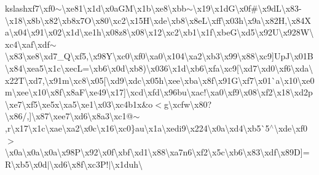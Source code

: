 kslash{}xf7\textbackslash{}xf0$\sim$\textbackslash{}xe81\textbackslash{}x1d\textbackslash{}x0a\+G\+M\textbackslash{}x1b\textbackslash{}xe8\textbackslash{}xbb$\sim$\textbackslash{}x19\textbackslash{}x1d\+G\textbackslash{}x0f\#\textbackslash{}x9d\+L\textbackslash{}x83-\/\textbackslash{}x18\textbackslash{}x8b\textbackslash{}x82\textbackslash{}xb8x7\+O\textbackslash{}x80\textbackslash{}xc2\textbackslash{}x15\+H\textbackslash{}xde\textbackslash{}xb8\textbackslash{}x8e\+L\textbackslash{}xff\textbackslash{}x03h\textbackslash{}x9a\textbackslash{}x82\+H,\textbackslash{}x84\+Xa\textbackslash{}x04\textbackslash{}x91\textbackslash{}x02\textbackslash{}x1d\textbackslash{}xe1h\textbackslash{}x08z8\textbackslash{}x08\textquotesingle{}\textbackslash{}x12\textbackslash{}xc2\textbackslash{}xb1\textbackslash{}x1f\textbackslash{}xbe\+G\textbackslash{}xd5\textbackslash{}x92\+U\textbackslash{}x928\+W\textbackslash{}xc4\textbackslash{}xaf\textbackslash{}xdf$\sim$\textbackslash{}x83\textbackslash{}xe8\textbackslash{}xd7\+\_\+\+Q\textbackslash{}xf5,\textbackslash{}x98\+Y\textbackslash{}xc0\textbackslash{}xf0\textbackslash{}xa0\textbackslash{}x104\textbackslash{}xa2\textbackslash{}xb3\textbackslash{}x99\textbackslash{}x88\textbackslash{}xc9\mbox{]}\+Up\+J\textbackslash{}x01\+B\textbackslash{}x84\textbackslash{}xea5\textbackslash{}x1c\textbackslash{}xec\+L=\textbackslash{}xb6\textbackslash{}x0d\textbackslash{}xb8)\textbackslash{}x036\textbackslash{}x1d\textbackslash{}xb6\textbackslash{}xfa\textbackslash{}xc9\mbox{[}\textbackslash{}xd7\textbackslash{}xd0\textbackslash{}xf6\textbackslash{}xda\textbackslash{}x22\+T\textbackslash{}xd7,\textbackslash{}x91m\textbackslash{}xc8\textbackslash{}x05\mbox{[}\textbackslash{}xd9\textbackslash{}xdc\textbackslash{}x05h\textbackslash{}xee\textbackslash{}xba\textbackslash{}x8f\textbackslash{}x91\+G\textbackslash{}xf7\textbackslash{}x01\`{}a\textbackslash{}x10\textbackslash{}xe0m\textbackslash{}xee\textbackslash{}x10\textbackslash{}x8f\textbackslash{}x8a\+F\textbackslash{}xe49\textbackslash{}x17\mbox{]}\textbackslash{}xcd\textbackslash{}xfd\textbackslash{}x96bu\textbackslash{}xac!\textbackslash{}xa0\textbackslash{}xf9\textbackslash{}x08\textbackslash{}xf2\textbackslash{}x18\textbackslash{}xd2p\textbackslash{}xe7\textbackslash{}xf5\textbackslash{}xe5x\textbackslash{}xa5\textbackslash{}xe1\textbackslash{}x03\textbackslash{}xc4b1x\&o$<$g\textbackslash{}xcfw\textbackslash{}x80?\textbackslash{}x86/,\mbox{]}\textbackslash{}x87\textbackslash{}xee7\textbackslash{}xd6\textbackslash{}x8a3\textbackslash{}xc1@$\sim$,r\textbackslash{}x17\textbackslash{}x1c\textbackslash{}xae\textbackslash{}xa2\textbackslash{}x0c\textbackslash{}x16\textbackslash{}xc0\}au\textbackslash{}x1a\textbackslash{}xedi9\textbackslash{}x224\textbackslash{}x0a\textbackslash{}xd4\textbackslash{}xb5\`{}5$^\wedge$\textbackslash{}xde\textbackslash{}xf0$>$\textbackslash{}x0a\textbackslash{}x0a\textbackslash{}x0a\textbackslash{}x98\+P\textbackslash{}x92\textbackslash{}x0f\textbackslash{}xbf\textbackslash{}xd1\textbackslash{}x88\textbackslash{}xa7n6\textbackslash{}xf2\textbackslash{}x5c\textbackslash{}xb6\textbackslash{}x83\textbackslash{}xdf\textbackslash{}x89\+D\mbox{]}=\+R\textbackslash{}xb5\textbackslash{}x0d$\vert$\textbackslash{}xd6\textbackslash{}x8f\textbackslash{}xc3\+P!$\vert$\textbackslash{}x1duh\textbackslash